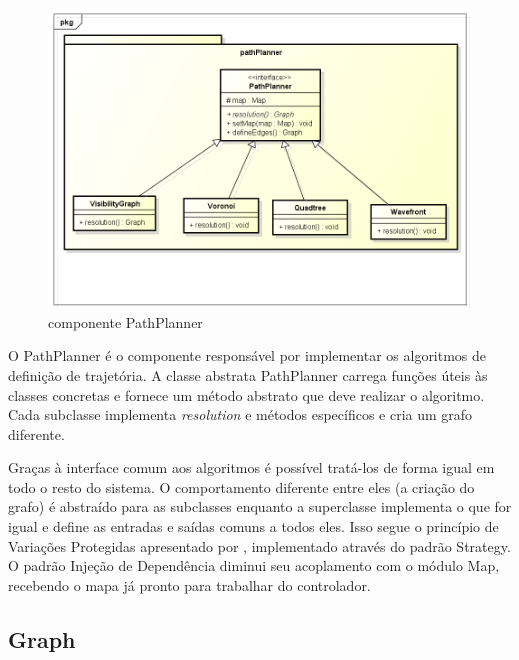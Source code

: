 \begin{figure}[h]
	\centering
	\label{fig25}
		\includegraphics[keepaspectratio=true,scale=0.5]{figuras/pkgpathplanner.png}
	\caption{componente PathPlanner}
\end{figure}

O PathPlanner é o componente responsável por implementar os algoritmos de definição de trajetória. A classe abstrata PathPlanner carrega funções úteis às classes concretas e fornece um método abstrato que deve realizar o algoritmo. Cada subclasse implementa \textit{resolution} e métodos específicos e cria um grafo diferente.

Graças à interface comum aos algoritmos é possível tratá-los de forma igual em todo o resto do sistema. O comportamento diferente entre eles (a criação do grafo) é abstraído para as subclasses enquanto a superclasse implementa o que for igual e define as entradas e saídas comuns a todos eles. Isso segue o princípio de Variações Protegidas apresentado por \cite{Larman2005}, implementado através do padrão Strategy. O padrão Injeção de Dependência diminui seu acoplamento com o módulo Map, recebendo o mapa já pronto para trabalhar do controlador.

\subsection{Graph}

